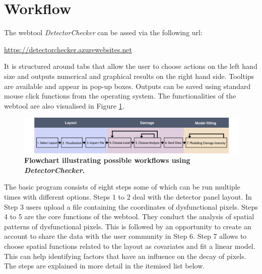 \documentclass[11pt,a4paper,twosided]{article}
\newcommand{\DetectorChecker}{\emph{DetectorChecker}\xspace}
\begin{document}
\section{Workflow}\label{flow}

The webtool \DetectorChecker can be assed via the following url:

\begin{mdframed}
\bigskip
\centerline{
\url{https://detectorchecker.azurewebsites.net}
}
\medskip
\end{mdframed}

It is structured around tabs that allow the user to choose actions on the left hand size and outputs 
numerical and graphical results on the right hand side. Tooltips are available and appear in pop-up boxes.
Outputs can be saved using standard mouse click functions from the operating system. 
The functionalities of the webtool are also visualised in Figure \ref{fig_flowchart}.

\begin{figure}[htbp]
\begin{center}
\hspace{-11mm}
\includegraphics[width=15.5cm]{flowchartDCshort.jpg}
\caption
{
{\bfseries 
Flowchart illustrating possible workflows using \DetectorChecker.}
}
\label{fig_flowchart}
\end{center}
\end{figure}


The basic program consists of eight steps some of which can be run multiple times with different options.
Steps 1 to 2 deal with the detector panel layout. In Step 3 users upload a file containing the coordinates of dysfunctional pixels. Steps 4 to 5 are the core functions of the webtool. They conduct the analysis of spatial patterns of dysfunctional pixels. This is followed by an opportunity to create an account to share the data with the user community in Step 6. Step 7 allows to choose spatial functions related to the layout as covariates and fit a linear model. This can help identifying factors that have an influence on the decay of pixels. The steps are explained in more detail in the itemised list below.

\bigskip
\end{document}
